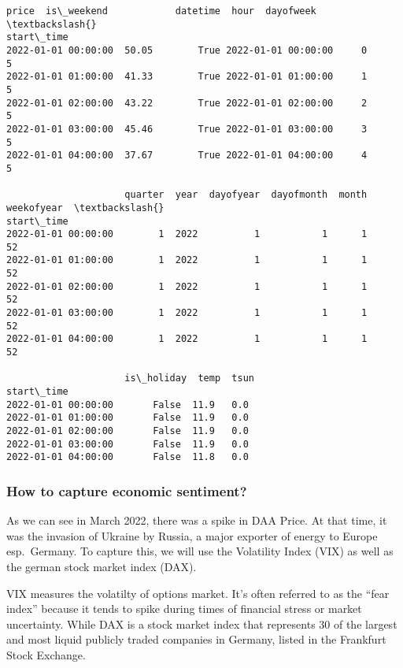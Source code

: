 \documentclass[11pt]{article}
\makeatletter
\newcommand{\boxspacing}{\kern\kvtcb@left@rule\kern\kvtcb@boxsep}
\newcommand{\prompt}[4]{
        {\ttfamily\llap{{\color{#2}[#3]:\hspace{3pt}#4}}\vspace{-\baselineskip}}
    }
\makeatother
\begin{document}
            \begin{tcolorbox}[breakable, size=fbox, boxrule=.5pt, pad at break*=1mm, opacityfill=0]
\prompt{Out}{outcolor}{24}{\boxspacing}
\begin{Verbatim}[commandchars=\\\{\}]
                     price  is\_weekend            datetime  hour  dayofweek  \textbackslash{}
start\_time
2022-01-01 00:00:00  50.05        True 2022-01-01 00:00:00     0          5
2022-01-01 01:00:00  41.33        True 2022-01-01 01:00:00     1          5
2022-01-01 02:00:00  43.22        True 2022-01-01 02:00:00     2          5
2022-01-01 03:00:00  45.46        True 2022-01-01 03:00:00     3          5
2022-01-01 04:00:00  37.67        True 2022-01-01 04:00:00     4          5

                     quarter  year  dayofyear  dayofmonth  month  weekofyear  \textbackslash{}
start\_time
2022-01-01 00:00:00        1  2022          1           1      1          52
2022-01-01 01:00:00        1  2022          1           1      1          52
2022-01-01 02:00:00        1  2022          1           1      1          52
2022-01-01 03:00:00        1  2022          1           1      1          52
2022-01-01 04:00:00        1  2022          1           1      1          52

                     is\_holiday  temp  tsun
start\_time
2022-01-01 00:00:00       False  11.9   0.0
2022-01-01 01:00:00       False  11.9   0.0
2022-01-01 02:00:00       False  11.9   0.0
2022-01-01 03:00:00       False  11.9   0.0
2022-01-01 04:00:00       False  11.8   0.0
\end{Verbatim}
\end{tcolorbox}
        
    \subsubsection{\texorpdfstring{{\textbf{How to capture economic
sentiment?}}}{How to capture economic sentiment?}}\label{how-to-capture-economic-sentiment}

As we can see in March 2022, there was a spike in DAA Price. At that
time, it was the invasion of Ukraine by Russia, a major exporter of
energy to Europe esp.~Germany. To capture this, we will use the
Volatility Index (VIX) as well as the german stock market index (DAX).

VIX measures the volatilty of options market. It's often referred to as
the ``fear index'' because it tends to spike during times of financial
stress or market uncertainty. While DAX is a stock market index that
represents 30 of the largest and most liquid publicly traded companies
in Germany, listed in the Frankfurt Stock Exchange.
\end{document}
